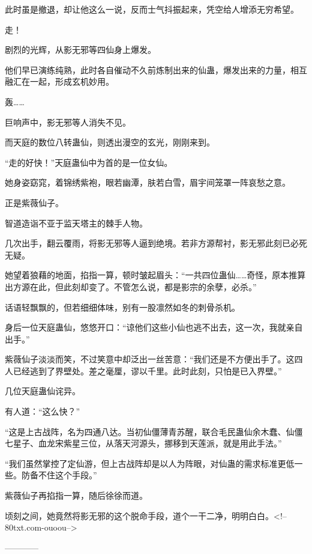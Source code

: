 \begin{this_body}
此时虽是撤退，却让他这么一说，反而士气抖振起来，凭空给人增添无穷希望。

走！

剧烈的光辉，从影无邪等四仙身上爆发。

他们早已演练纯熟，此时各自催动不久前炼制出来的仙蛊，爆发出来的力量，相互融汇在一起，形成玄机妙用。

轰……

巨响声中，影无邪等人消失不见。

而天庭的数位八转蛊仙，则透出漫空的玄光，刚刚来到。

“走的好快！”天庭蛊仙中为首的是一位女仙。

她身姿窈窕，着锦绣紫袍，眼若幽潭，肤若白雪，眉宇间笼罩一阵哀愁之意。

正是紫薇仙子。

智道造诣不亚于监天塔主的棘手人物。

几次出手，翻云覆雨，将影无邪等人逼到绝境。若非方源帮衬，影无邪此刻已必死无疑。

她望着狼藉的地面，掐指一算，顿时皱起眉头：“一共四位蛊仙……奇怪，原本推算出方源在此，但此刻却变了。不管怎么说，都是影宗的余孽，必杀。”

话语轻飘飘的，但若细细体味，别有一股凛然如冬的刺骨杀机。

身后一位天庭蛊仙，悠悠开口：“谅他们这些小仙也逃不出去，这一次，我就亲自出手。”

紫薇仙子淡淡而笑，不过笑意中却泛出一丝苦意：“我们还是不方便出手了。这四人已经逃到了界壁处。差之毫厘，谬以千里。此时此刻，只怕是已入界壁。”

几位天庭蛊仙诧异。

有人道：“这么快？”

“这是上古战阵，名为四通八达。当初仙僵薄青苏醒，联合毛民蛊仙余木蠢、仙僵七星子、血龙宋紫星三位，从落天河源头，挪移到天莲派，就是用此手法。”

“我们虽然掌控了定仙游，但上古战阵却是以人为阵眼，对仙蛊的需求标准更低一些。防备不住这个手段。”

紫薇仙子再掐指一算，随后徐徐而道。

顷刻之间，她竟然将影无邪的这个脱命手段，道个一干二净，明明白白。<!--80txt.com-ouoou-->

------------

\end{this_body}

